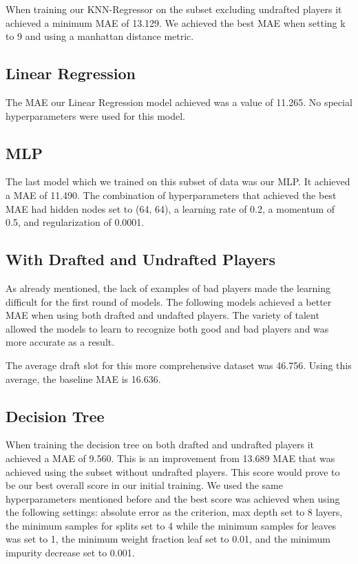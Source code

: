 \documentclass{article}
\begin{document}
When training our KNN-Regressor on the subset excluding undrafted players it
achieved a minimum MAE of 13.129. We achieved the best MAE when setting k to 9
and using a manhattan distance metric.

\subsection{Linear Regression}

The MAE our Linear Regression model achieved was a value of 11.265. No special
hyperparameters were used for this model.

\subsection{MLP}

The last model which we trained on this subset of data was our MLP. It achieved
a MAE of 11.490. The combination of hyperparameters that achieved the
best MAE had hidden nodes set to (64, 64), a learning rate of 0.2, a momentum of
0.5, and regularization of 0.0001.

\subsection{With Drafted and Undrafted Players}

As already mentioned, the lack of examples of bad players made the learning
difficult for the first round of models. The following models achieved a better
MAE when using both drafted and undafted players. The variety of talent allowed
the models to learn to recognize both good and bad players and was more accurate
as a result.

The average draft slot for this more comprehensive dataset was 46.756. Using
this average, the baseline MAE is 16.636.

\subsection{Decision Tree}

When training the decision tree on both drafted and undrafted players it
achieved a MAE of 9.560. This is an improvement from 13.689 MAE that was
achieved using the subset without undrafted players. This score would prove to
be our best overall score in our initial training. We used the same
hyperparameters mentioned before and the best score was achieved when using the
following settings: absolute error as the criterion, max depth set to 8 layers,
the minimum samples for splits set to 4 while the minimum samples for leaves was
set to 1, the minimum weight fraction leaf set to 0.01, and the minimum impurity
decrease set to 0.001.
\end{document}

